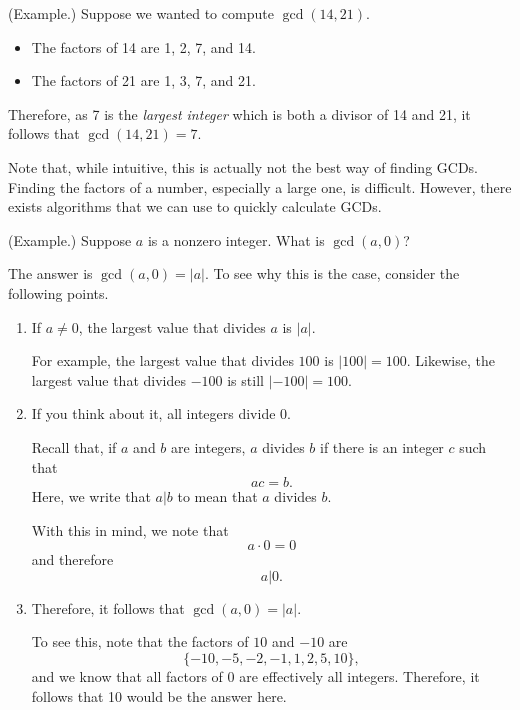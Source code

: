 \documentclass[letterpaper]{article}
\newcommand{\0}{\mathbf{0}}
\begin{document}
\begin{mdframed}
    (Example.) Suppose we wanted to compute $\gcd(14, 21)$. 
    \begin{itemize}
        \item The factors of 14 are 1, 2, 7, and 14.
        \item The factors of 21 are 1, 3, 7, and 21. 
    \end{itemize}
    Therefore, as 7 is the \emph{largest integer} which is both a divisor of 14 and 21, it follows that $\gcd(14, 21) = 7$.
\end{mdframed}
Note that, while intuitive, this is actually not the best way of finding GCDs. Finding the factors of a number, especially a large one, is difficult. However, there exists algorithms that we can use to quickly calculate GCDs.

\begin{mdframed}
    (Example.) Suppose $a$ is a nonzero integer. What is $\gcd(a, 0)$?

    \begin{mdframed}
        The answer is $\gcd(a, 0) = |a|$. To see why this is the case, consider the following points. 

        \begin{enumerate}
            \item If $a \neq 0$, the largest value that divides $a$ is $|a|$. 
            \begin{mdframed}
                For example, the largest value that divides $100$ is $|100| = 100$. Likewise, the largest value that divides $-100$ is still $|-100| = 100$. 
            \end{mdframed}

            \item If you think about it, all integers divide 0. 
            \begin{mdframed}
                Recall that, if $a$ and $b$ are integers, $a$ divides $b$ if there is an integer $c$ such that 
                \[ac = b.\]
                Here, we write that $a | b$ to mean that $a$ divides $b$. 

                \bigskip 

                With this in mind, we note that 
                \[a \cdot 0 = 0\]
                and therefore 
                \[a | 0.\]
            \end{mdframed}

            \item Therefore, it follows that $\gcd(a, 0) = |a|$. 
            \begin{mdframed}
                To see this, note that the factors of $10$ and $-10$ are 
                \[\{-10, -5, -2, -1, 1, 2, 5, 10\},\]
                and we know that all factors of $0$ are effectively all integers. Therefore, it follows that 10 would be the answer here. 
            \end{mdframed}
        \end{enumerate}
    \end{mdframed}
\end{mdframed}
\end{document}
